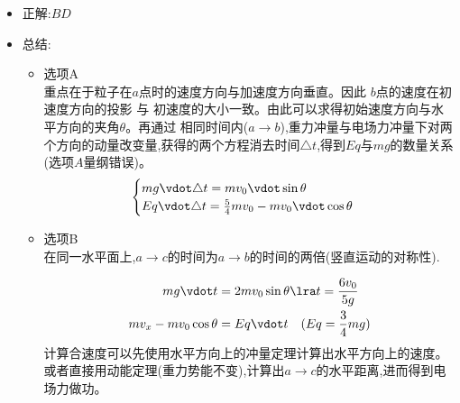 \documentclass{article}
\begin{document}
\begin{itemize}
    \item 正解:\quad $BD$
    \item 总结:\quad
          \begin{itemize}
              \item 选项A \\
                    重点在于粒子在$a$点时的速度方向与加速度方向垂直。因此 \quad $b$点的速度在初速度方向的投影 \quad 与 \quad 初速度的大小一致。由此可以求得初始速度方向与水平方向的夹角$\theta$。再通过
                    相同时间内($a \rightarrow b$),重力冲量与电场力冲量下对两个方向的动量改变量,获得的两个方程消去时间$\triangle t$,得到$Eq$与$mg$的数量关系(选项$A$量纲错误)。
                    $$
                        \begin{cases}
                            mg \vdot \triangle t = m v_{0} \vdot \sin{\theta} \\
                            Eq \vdot \triangle t = \frac{5}{4} m v_{0} - m v_{0} \vdot \cos{\theta}
                        \end{cases}
                    $$

              \item 选项B \\
                    在同一水平面上,$a \rightarrow c$的时间为$a \rightarrow b$的时间的两倍(竖直运动的对称性).

                    \begin{align*}
                        mg \vdot t                     & = 2 m v_{0} \sin{\theta} \lra t = \frac{6 v_{0}}{5 g} \\
                        m v_{x} - m v_{0} \cos{\theta} & = Eq \vdot t \quad (Eq = \frac{3}{4} mg)
                    \end{align*}
                    计算合速度可以先使用水平方向上的冲量定理计算出水平方向上的速度。或者直接用动能定理(重力势能不变),计算出$a \rightarrow c$的水平距离,进而得到电场力做功。
          \end{itemize}
\end{itemize}

\vspace{2em}
\end{document}
